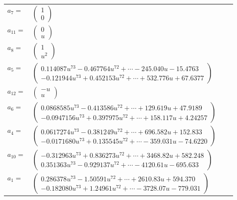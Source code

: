 \documentclass[1p]{elsarticle_modified}
\theoremstyle{definition}
\begin{document}
\begin{tabular}{m{7pt} m{180pt} m{7pt} m{180pt} }
\flushright $a_{7}=$&$\begin{pmatrix}1\\0\end{pmatrix}$ \\
\flushright $a_{11}=$&$\begin{pmatrix}0\\u\end{pmatrix}$ \\
\flushright $a_{8}=$&$\begin{pmatrix}1\\u^2\end{pmatrix}$ \\
\flushright $a_{5}=$&$\begin{pmatrix}0.114087 u^{73}-0.467764 u^{72}+\cdots-245.040 u-15.4763\\-0.121944 u^{73}+0.452153 u^{72}+\cdots+532.776 u+67.6377\end{pmatrix}$ \\
\flushright $a_{12}=$&$\begin{pmatrix}- u\\u\end{pmatrix}$ \\
\flushright $a_{6}=$&$\begin{pmatrix}0.0868585 u^{73}-0.413586 u^{72}+\cdots+129.619 u+47.9189\\-0.0947156 u^{73}+0.397975 u^{72}+\cdots+158.117 u+4.24257\end{pmatrix}$ \\
\flushright $a_{4}=$&$\begin{pmatrix}0.0617274 u^{73}-0.381249 u^{72}+\cdots+696.582 u+152.833\\-0.0171680 u^{73}+0.135545 u^{72}+\cdots-359.031 u-74.6220\end{pmatrix}$ \\
\flushright $a_{10}=$&$\begin{pmatrix}-0.312963 u^{73}+0.836273 u^{72}+\cdots+3468.82 u+582.248\\0.351363 u^{73}-0.929137 u^{72}+\cdots-4120.61 u-695.633\end{pmatrix}$ \\
\flushright $a_{1}=$&$\begin{pmatrix}0.286378 u^{73}-1.50591 u^{72}+\cdots+2610.83 u+594.370\\-0.182080 u^{73}+1.24961 u^{72}+\cdots-3728.07 u-779.031\end{pmatrix}$ \\

\end{tabular}
\end{document}
